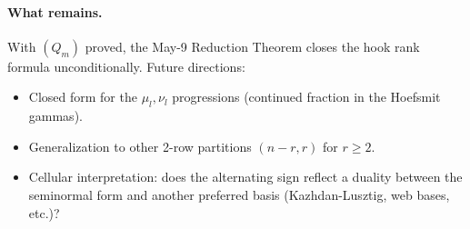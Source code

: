 \documentclass[11pt]{article}
\theoremstyle{definition}
\begin{document}
\paragraph{What remains.}
With $(Q_m)$ proved, the May-9 Reduction Theorem closes the hook rank
formula unconditionally.  Future directions:
\begin{itemize}[topsep=0.3em,itemsep=0.2em,leftmargin=2em]
\item Closed form for the $\mu_l, \nu_l$ progressions (continued
  fraction in the Hoefsmit gammas).
\item Generalization to other 2-row partitions $(n-r, r)$ for $r \ge 2$.
\item Cellular interpretation: does the alternating sign reflect a
  duality between the seminormal form and another preferred basis
  (Kazhdan-Lusztig, web bases, etc.)?
\end{itemize}
\end{document}
